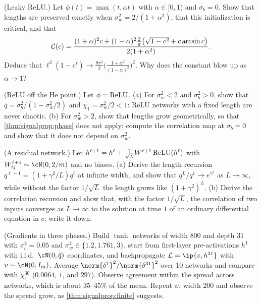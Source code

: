 \begin{refsection}
\begin{exercises}
\item \variation (Leaky ReLU.) Let $\phi(t)=\max(t,\alpha t)$ with $\alpha\in[0,1)$ and $\sigma_b=0$. Show that lengths are preserved exactly when $\sigma_w^2=2/(1+\alpha^2)$, that this initialization is critical, and that
\[
  \mathcal{C}(c)=\frac{(1+\alpha)^2c+(1-\alpha)^2\frac2\pi\bigl(\sqrt{1-c^2}+c\arcsin c\bigr)}{2(1+\alpha^2)} .
\]
Deduce that $\ell^2(1-c^\ell)\to\frac{9\pi^2}2\bigl(\frac{1+\alpha^2}{(1-\alpha)^2}\bigr)^2$. Why does the constant blow up as $\alpha\to1$?\label{ex:signalprop:leaky}

\item \variation (ReLU off the He point.) Let $\phi=\operatorname{ReLU}$. (a) For $\sigma_w^2<2$ and $\sigma_b^2>0$, show that $\bar q=\sigma_b^2/(1-\sigma_w^2/2)$ and $\chi_1=\sigma_w^2/2<1$: ReLU networks with a fixed length are never chaotic. (b) For $\sigma_w^2>2$, show that lengths grow geometrically, so that \cref{thm:signalprop:phase} does not apply; compute the correlation map at $\sigma_b=0$ and show that it does not depend on $\sigma_w^2$.\label{ex:signalprop:relubias}

\item \variation (A residual network.) Let $h^{\ell+1}=h^\ell+\frac{\gamma}{\sqrt L}W^{\ell+1}\operatorname{ReLU}(h^\ell)$ with $W^{\ell+1}_{ij}\sim\cN(0,2/m)$ and no biases. (a) Derive the length recursion $q^{\ell+1}=(1+\gamma^2/L)q^\ell$ at infinite width, and show that $q^L/q^1\to e^{\gamma^2}$ as $L\to\infty$, while without the factor $1/\sqrt L$ the length grows like $(1+\gamma^2)^L$. (b) Derive the correlation recursion and show that, with the factor $1/\sqrt L$, the correlation of two inputs converges as $L\to\infty$ to the solution at time $1$ of an ordinary differential equation in $c$; write it down.\label{ex:signalprop:resnet}

\item \simulation (Gradients in three phases.) Build $\tanh$ networks of width $800$ and depth $31$ with $\sigma_b^2=0.05$ and $\sigma_w^2\in\{1.2,1.761,3\}$, start from first-layer pre-activations $h^1$ with i.i.d.\ $\cN(0,\bar q)$ coordinates, and backpropagate $\Loss=\ip{v,h^{31}}$ with $v\sim\cN(0,I_m)$. Average $\norm{\delta^1}^2/\norm{\delta^{31}}^2$ over $10$ networks and compare with $\chi_1^{30}$ ($0.0064$, $1$, and $297$). Observe agreement within the spread across networks, which is about $35$--$45\%$ of the mean. Repeat at width $200$ and observe the spread grow, as \cref{thm:signalprop:finite} suggests.\label{ex:signalprop:grad}


\end{exercises}
\end{refsection}
